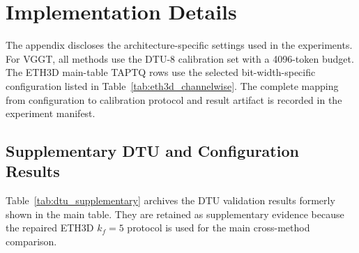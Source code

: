 \documentclass[journal]{Tail_Aware_Post_Training_Quantization_for_3D_Geometry_Models_TMM/IEEEtran}
\begin{document}
\appendices
\section{Implementation Details}
\label{app:implementation_details}

The appendix discloses the architecture-specific settings used in the experiments. For VGGT, all methods use the DTU-8 calibration set with a 4096-token budget. The ETH3D main-table TAPTQ rows use the selected bit-width-specific configuration listed in Table~\ref{tab:eth3d_channelwise}. The complete mapping from configuration to calibration protocol and result artifact is recorded in the experiment manifest.

\subsection{Supplementary DTU and Configuration Results}

Table~\ref{tab:dtu_supplementary} archives the DTU validation results formerly shown in the main table. They are retained as supplementary evidence because the repaired ETH3D $k_f=5$ protocol is used for the main cross-method comparison.
\end{document}
